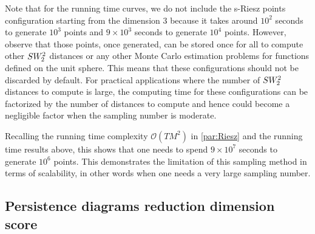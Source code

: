 \begin{Rk}
Note that for the running time curves, we do not include the s-Riesz 
points configuration starting from the dimension 3 because it takes around 
$10^2$ seconds to generate $10^3$ points and $9\times 10^3$ seconds to generate 
$10^4$ points. {However, observe that those points, once generated, can be stored once for all to compute 
other $SW_2^2$ distances or any other Monte Carlo estimation problems for functions defined 
on the unit sphere. This means that these configurations should not be discarded by default. 
For practical applications where the number of $SW_2^2$ distances to compute is large, the computing time for these configurations can be factorized by the number of distances to compute and hence could become a negligible factor} {when the sampling number is moderate.}
\end{Rk}

\begin{Rk}
{Recalling the running time complexity $\mathcal{O}(TM^2)$ in \autoref{par:Riesz} and the running time results above, this shows that one needs to spend $9\times 10^7$ seconds to generate $10^6$ points. This demonstrates the limitation of this sampling method in terms of scalability, in other words when one needs a very large sampling number.}
\end{Rk}


\subsection{Persistence diagrams reduction dimension score}
\label{sec:tda}

